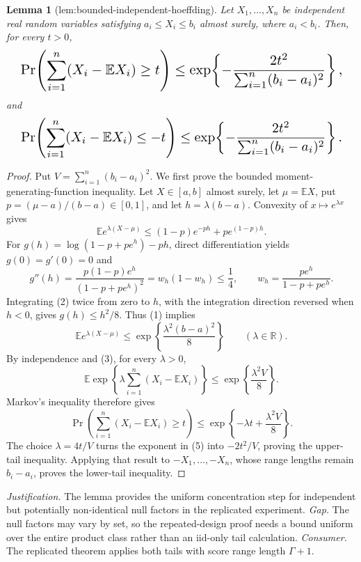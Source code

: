 \documentclass{article}
\newtheorem{lemma}{Lemma}
\begin{document}
\begin{lemma}[lem:bounded-independent-hoeffding]\label{lem:bounded-independent-hoeffding}
Let \(X_1,\ldots,X_n\) be independent real random variables satisfying \(a_i\leq X_i\leq b_i\) almost surely, where \(a_i<b_i\). Then, for every \(t>0\),
\[
\makebox[\linewidth][c]{\resizebox{0.98\linewidth}{!}{\par\noindent \makebox[\linewidth][c]{\resizebox{0.98\linewidth}{!}{\(\displaystyle \displaystyle \Pr\!\left(\sum_{i=1}^n(X_i-\mathbb E X_i)\geq t\right)\leq\exp\!\left\{-\frac{2t^2}{\sum_{i=1}^n(b_i-a_i)^2}\right\},\)}}\par\noindent}}
\]
and
\[
\makebox[\linewidth][c]{\resizebox{0.98\linewidth}{!}{\par\noindent \makebox[\linewidth][c]{\resizebox{0.98\linewidth}{!}{\(\displaystyle \displaystyle \Pr\!\left(\sum_{i=1}^n(X_i-\mathbb E X_i)\leq-t\right)\leq\exp\!\left\{-\frac{2t^2}{\sum_{i=1}^n(b_i-a_i)^2}\right\}.\)}}\par\noindent}}
\]
\end{lemma}
\begin{proof}
Put \(V=\sum_{i=1}^n(b_i-a_i)^2\). We first prove the bounded moment-generating-function inequality. Let \(X\in[a,b]\) almost surely, let \(\mu=\mathbb E X\), put \(p=(\mu-a)/(b-a)\in[0,1]\), and let \(h=\lambda(b-a)\). Convexity of \(x\mapsto e^{\lambda x}\) gives
\[
 \mathbb E e^{\lambda(X-\mu)}\leq (1-p)e^{-ph}+pe^{(1-p)h}.\tag{1}
\]
For \(g(h)=\log(1-p+pe^h)-ph\), direct differentiation yields \(g(0)=g'(0)=0\) and
\[
 g''(h)=\frac{p(1-p)e^h}{(1-p+pe^h)^2}=w_h(1-w_h)\leq\frac14,\qquad w_h=\frac{pe^h}{1-p+pe^h}.\tag{2}
\]
Integrating (2) twice from zero to \(h\), with the integration direction reversed when \(h<0\), gives \(g(h)\leq h^2/8\). Thus (1) implies
\[
 \mathbb E e^{\lambda(X-\mu)}\leq\exp\left\{\frac{\lambda^2(b-a)^2}{8}\right\}\qquad(\lambda\in\mathbb R).\tag{3}
\]
By independence and (3), for every \(\lambda>0\),
\[
 \mathbb E\exp\left\{\lambda\sum_{i=1}^n(X_i-\mathbb E X_i)\right\}\leq\exp\left\{\frac{\lambda^2V}{8}\right\}.\tag{4}
\]
Markov's inequality therefore gives
\[
 \Pr\!\left(\sum_{i=1}^n(X_i-\mathbb E X_i)\geq t\right)\leq\exp\left\{-\lambda t+\frac{\lambda^2V}{8}\right\}.\tag{5}
\]
The choice \(\lambda=4t/V\) turns the exponent in (5) into \(-2t^2/V\), proving the upper-tail inequality. Applying that result to \(-X_1,\ldots,-X_n\), whose range lengths remain \(b_i-a_i\), proves the lower-tail inequality.
\end{proof}
\par\smallskip\noindent \textit{Justification.} The lemma provides the uniform concentration step for independent but potentially non-identical null factors in the replicated experiment. \textit{Gap.} The null factors may vary by set, so the repeated-design proof needs a bound uniform over the entire product class rather than an iid-only tail calculation. \textit{Consumer.} The replicated theorem applies both tails with score range length \(\Gamma+1\).
\end{document}
